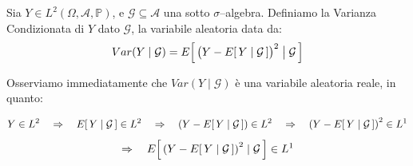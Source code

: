 \begin{definizione}
    Sia $Y\in L^2(\Omega, \mathcal{A}, \mathbb{P})$, e $\mathcal{G}\subseteq \mathcal{A}$ una sotto $\sigma$--algebra. Definiamo la Varianza Condizionata di $Y$ dato $\mathcal{G}$, la variabile aleatoria data da:
    \[Var(Y\mid\mathcal{G}) = E\!\left[\,\bigl(Y-E\!\left[\,Y\mid \mathcal{G}\,\right]\bigr)^2 \;\big|\; \mathcal{G}\,\right]\]
\end{definizione}

\noindent Osserviamo immediatamente che $Var(Y\mid \mathcal{G})$ è una variabile aleatoria reale, in quanto:

\[Y\in L^2 \quad \Rightarrow\quad E\!\left[\,Y\mid \mathcal{G}\,\right]\in L^2 \quad \Rightarrow\quad \left(Y - E\!\left[\,Y\mid \mathcal{G}\,\right]\right)\in L^2 \quad \Rightarrow\quad \left(Y - E\!\left[\,Y\mid \mathcal{G}\,\right]\right)^2\in L^1\]
\[\Rightarrow\quad E\!\left[\,\left(Y - E\!\left[\,Y\mid \mathcal{G}\,\right]\right)^2\mid \mathcal{G}\,\right]\in L^1\]

